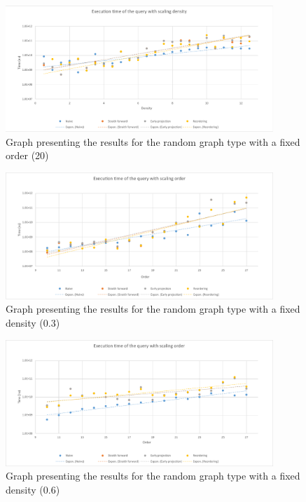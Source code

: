 \begin{figure}[h]
\center
	\includegraphics[width=0.9\textwidth]{figures/results_random_order}%
	\caption{Graph presenting the results for the random graph type with a fixed order (20)}
	\label{fig:ResultsRandomOrder}
\end{figure}
\begin{figure}[h]
\center
	\includegraphics[width=0.9\textwidth]{figures/results_random_density2}%
	\caption{Graph presenting the results for the random graph type with a fixed density (0.3)}
	\label{fig:ResultsRandomDensity2}
\end{figure}
\begin{figure}[h]
\center
	\includegraphics[width=0.9\textwidth]{figures/results_random_density3}%
	\caption{Graph presenting the results for the random graph type with a fixed density (0.6)}
	\label{fig:ResultsRandomDensity3}
\end{figure}


